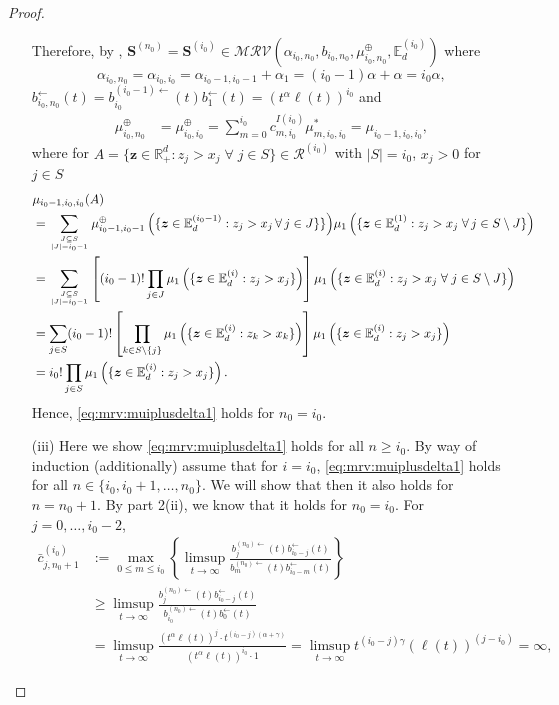 \documentclass[aos]{imsart}
\numberwithin{equation}{section}
\theoremstyle{plain} %
\theoremstyle{remark}
\newcommand{\E}{\mathbb{E}}
\newcommand{\R}{\mathbb{R}}
\def\MRV{\mathcal{MRV}}
\def\bS{\boldsymbol{S}}
\def\bz{\boldsymbol z}
\begin{document}
\begin{proof}
\begin{enumerate}[(1)]
Therefore, by , $\bS^{(n_0)}=\bS^{(i_0)}\in\MRV(\alpha_{i_0,n_0},b_{i_0,n_0},\mu_{i_0,n_0}^{\oplus},\E_d^{(i_0)})$ where $$\alpha_{i_0,n_0}=\alpha_{i_0,i_0}=\alpha_{i_0-1,i_0-1}+\alpha_{1}=(i_0-1)\alpha+\alpha=i_0\alpha,$$ ${b}_{i_0,n_0}^{\leftarrow}(t)= b_{i_0}^{(i_0-1)\leftarrow}(t)b_1^{\leftarrow}(t)=(t^\alpha\ell(t))^{i_0}$ and
\begin{align*}
\mu_{i_0,n_0}^{\oplus} &= \mu_{i_0,i_0}^{\oplus} = \sum_{m=0}^{i_0} c_{m,i_0}^{I(i_0)}\mu^*_{m,i_0,i_0} = \mu_{i_0-1,i_0,i_0},
\end{align*}
where for $A=\{\bz\in\R_+^{d}:z_j>x_j \;\forall\; j\in S\}\in \mathcal{R}^{(i_0)}$ with $|S|= i_0$, $x_j>0$ for $j\in S$
\begin{align*}
& \mu_{i_0-1,i_0,i_0}(A)\\
& = \sum_{\genfrac{}{}{0pt}{}{J\subseteq S}{|J|=i_0-1}} \mu_{i_0-1,i_0-1}^{\oplus} \,\Big(\{\bz\in\E_d^{(i_0-1)}:  z_{j}>x_{j}\,\forall\,j\in J\}\}\Big)  \mu_{1}\left(\{\bz\in\E_d^{(1)}:z_{j}>x_{j} \;\forall\, j\in S\setminus J\}\right)\\
& = \sum_{\genfrac{}{}{0pt}{}{J\subseteq S}{|J|=i_0-1}} \left[(i_0-1)!\prod_{j\in J}
    \mu_1\left(\{\bz\in \E_d^{(i)}:z_j>x_j\}\right)\right] \mu_1\left(\{\bz\in \E_d^{(i)}:z_j>x_j\; \forall\; j\in S\setminus J\}\right) \\
&= \sum_{j\in S}  (i_0-1)!\left[ \prod_{k\in S\setminus \{j\}}
    \mu_1\left(\{\bz\in \E_d^{(i)}:z_k>x_k\}\right)\right]
    \mu_1\left(\{\bz\in \E_d^{(i)}:z_j>x_j\}\right)\\
    &= i_0! \prod_{j\in S}
    \mu_1\left(\{\bz\in \E_d^{(i)}:z_j>x_j\}\right).
\end{align*}
Hence, \eqref{eq:mrv:muiplusdelta1} holds for $n_0=i_0$.
\item[(iii)] Here we show \eqref{eq:mrv:muiplusdelta1} holds for all $n\ge i_0$. By way of induction (additionally) assume that for $i=i_0$, \eqref{eq:mrv:muiplusdelta1} holds for all $n\in \{i_0,i_0+1,\ldots,n_0\}$. We will show that then it also holds for $n=n_0+1$. By part 2(ii), we know that it holds for $n_0=i_0$. For $j=0, \ldots, i_0-2$,
\begin{align*}
\bar{c}_{j,n_0+1}^{(i_0)}&:=\max_{0\le m\le i_0}\left\{\limsup_{t\to\infty} \frac{b_{j}^{(n_0)\leftarrow}(t)b_{i_0-j}^{\leftarrow}(t)}{b_{m}^{(n_0)\leftarrow}(t)b_{i_0-m}^{\leftarrow}(t)} \right\} \\
& \ge \limsup_{t\to\infty} \frac{b_{j}^{(n_0)\leftarrow}(t)b_{i_0-j}^{\leftarrow}(t)}{b_{i_0}^{(n_0)\leftarrow}(t)b_{0}^{\leftarrow}(t)} \\ & = \limsup_{t\to\infty} \frac{(t^{\alpha}\ell(t))^{j}\cdot t^{(i_0-j)(\alpha+\gamma)}}{(t^{\alpha}\ell(t))^{i_0}\cdot 1} = \limsup_{t\to\infty} t^{(i_0-j)\gamma}(\ell(t))^{(j-i_0)} = \infty,

\end{align*}
\end{enumerate}
\end{proof}
\end{document}
